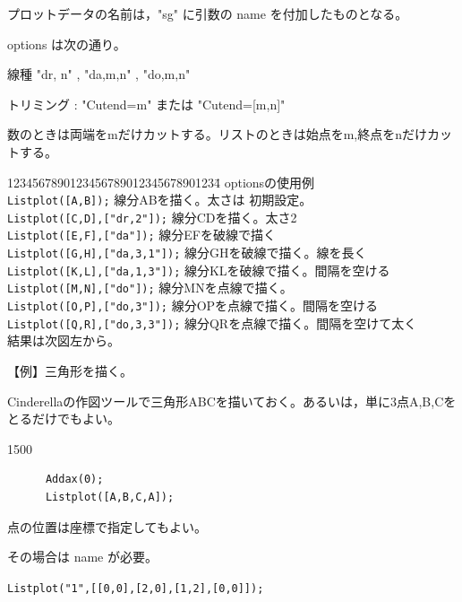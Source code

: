 \documentclass[papersize,a4paper,12pt,uplatex]{jsarticle}
\begin{document}
\begin{description}
プロットデータの名前は，"sg" に引数の name を付加したものとなる。

 options は次の通り。

線種   "dr, n"  , "da,m,n" , "do,m,n"

トリミング :  "Cutend=m" または "Cutend=[m,n]" 

数のときは両端をmだけカットする。リストのときは始点をm,終点をnだけカットする。

\begin{tabbing}
1234567890123456789012345678901234\=\kill
  optionsの使用例\\
    \verb|Listplot([A,B]);|            \>線分ABを描く。太さは 初期設定。\\
    \verb|Listplot([C,D],["dr,2"]);|     \>線分CDを描く。太さ2\\
    \verb|Listplot([E,F],["da"]);|       \>線分EFを破線で描く\\
    \verb|Listplot([G,H],["da,3,1"]);|   \>線分GHを破線で描く。線を長く\\
    \verb|Listplot([K,L],["da,1,3"]);|    \>線分KLを破線で描く。間隔を空ける\\
    \verb|Listplot([M,N],["do"]);|      \>線分MNを点線で描く。\\
    \verb|Listplot([O,P],["do,3"]);|     \>線分OPを点線で描く。間隔を空ける\\
    \verb|Listplot([Q,R],["do,3,3"]);|   \>線分QRを点線で描く。間隔を空けて太く\\
結果は次図左から。
\end{tabbing}
    \begin{center} \end{center}

【例】三角形を描く。

  Cinderellaの作図ツールで三角形ABCを描いておく。あるいは，単に3点A,B,Cをとるだけでもよい。

\begin{layer}{150}{0}
\end{layer}
\hspace{20mm}

\begin{verbatim}
      Addax(0);
      Listplot([A,B,C,A]);
\end{verbatim}

点の位置は座標で指定してもよい。

その場合は name が必要。

\hspace{10mm} \verb|Listplot("1",[[0,0],[2,0],[1,2],[0,0]]);|


\end{description}
\end{document}
